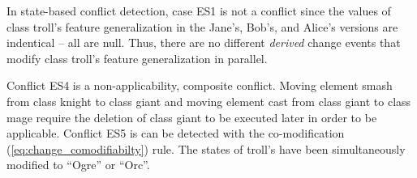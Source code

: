 In state-based conflict detection, case ES1 is not a conflict since the values of class \textsf{troll}'s feature \textsf{generalization} in the Jane's, Bob's, and Alice's versions are indentical -- all are null. Thus, there are no different \textit{derived} change events that modify class \textsf{troll}'s feature \textsf{generalization} in parallel. 

Conflict ES4 is a non-applicability, composite conflict. Moving element \textsf{smash} from class \textsf{knight} to class \textsf{giant} and moving element \textsf{cast} from class \textsf{giant} to class \textsf{mage} require the deletion of class \textsf{giant} to be executed later in order to be applicable. Conflict ES5 is can be detected with the co-modification  (\ref{eq:change_comodifiabilty}) rule. The states of \textsf{troll}'s  have been simultaneously modified to ``Ogre'' or ``Orc''.

